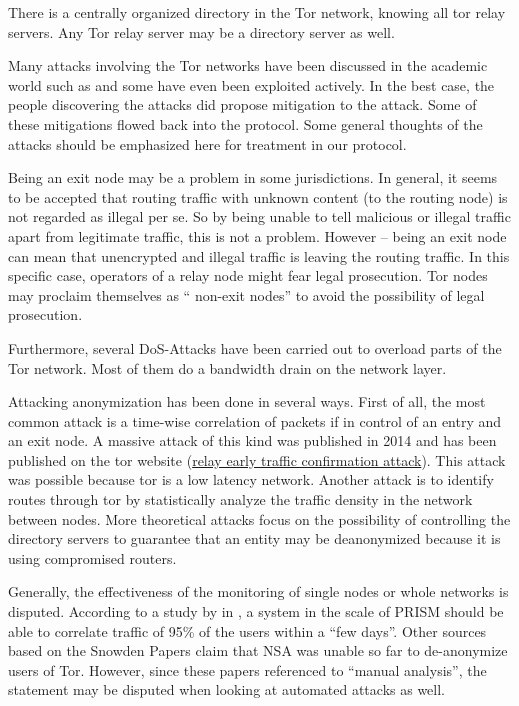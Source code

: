 There is a centrally organized directory in the Tor network, knowing all tor relay servers. Any Tor relay server may be a directory server as well. 

Many attacks involving the Tor networks have been discussed in the academic world such as \cite{hs-attack06,esorics13-cellflood,bauer:wpes2007,esorics12-torscan,oakland2013-trawling,danner-et-al:tissec12,congestion-longpaths} and some have even been exploited actively. In the best case, the people discovering the attacks did propose mitigation to the attack. Some of these mitigations flowed back into the protocol. Some general thoughts of the attacks should be emphasized here for treatment in our protocol.

Being an exit node may be a problem in some jurisdictions. In general, it seems to be accepted that routing traffic with unknown content (to the routing node) is not regarded as illegal per se. So by being unable to tell malicious or illegal traffic apart from legitimate traffic, this is not a problem. However -- being an exit node can mean that unencrypted and illegal traffic is leaving the routing traffic. In this specific case, operators of a relay node might fear legal prosecution. Tor nodes may proclaim themselves as  `` non-exit nodes''  to avoid the possibility of legal prosecution.

Furthermore, several DoS-Attacks have been carried out to overload parts of the Tor network. Most of them do a bandwidth drain on the network layer.

Attacking anonymization has been done in several ways. First of all, the most common attack is a time-wise correlation of packets if in control of an entry and an exit node. A massive attack of this kind was published in 2014 and has been published on the tor website (\href{https://blog.torproject.org/blog/tor-security-advisory-relay-early-traffic-confirmation-attack}{relay early traffic confirmation attack}). This attack was possible because tor is a low latency network. Another attack is to identify routes through tor by statistically analyze the traffic density in the network between nodes. More theoretical attacks focus on the possibility of controlling the directory servers to guarantee that an entity may be deanonymized because it is using compromised routers.

Generally, the effectiveness of the monitoring of single nodes or whole networks is disputed. According to a study by \citeauthor{ccs2013-usersrouted} in \citeyear{ccs2013-usersrouted}\cite{ccs2013-usersrouted}, a system in the scale of PRISM should be able to correlate traffic of 95\% of the users within a ``few days''. Other sources based on the Snowden Papers claim that NSA was unable so far to de-anonymize users of  Tor. However, since these papers referenced to ``manual analysis'', the statement may be disputed when looking at automated attacks as well.

